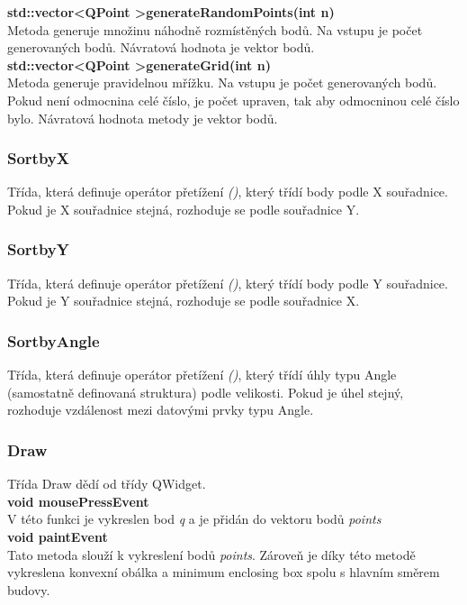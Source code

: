 \documentclass[a4paper,11pt,twoside]{article}
\begin{document}
\noindent\textbf{std::vector\textless QPoint \textgreater generateRandomPoints(int n)}\\
Metoda generuje množinu náhodně rozmístěných bodů. Na vstupu je počet generovaných bodů. Návratová hodnota je vektor bodů.\\

\noindent\textbf{std::vector\textless QPoint \textgreater generateGrid(int n)}\\
Metoda generuje pravidelnou mřížku. Na vstupu je počet generovaných bodů.  Pokud není odmocnina celé číslo, je počet upraven, tak aby odmocninou celé číslo bylo. Návratová hodnota metody je vektor bodů.

\subsubsection{SortbyX}
Třída, která definuje operátor přetížení \textit{()}, který třídí body podle X souřadnice. Pokud je X souřadnice stejná, rozhoduje se podle souřadnice Y.

\subsubsection{SortbyY}
Třída, která definuje operátor přetížení \textit{()}, který třídí body podle Y souřadnice. Pokud je Y souřadnice stejná, rozhoduje se podle souřadnice X.

\subsubsection{SortbyAngle}
Třída, která definuje operátor přetížení \textit{()}, který třídí úhly typu Angle (samostatně definovaná struktura) podle velikosti. Pokud je úhel stejný, rozhoduje vzdálenost mezi datovými prvky typu Angle.

\newpage
\vspace*{-1cm}
\subsubsection{Draw}
Třída Draw dědí od třídy QWidget. \\

\noindent\textbf{void mousePressEvent}\\
V této funkci je vykreslen bod \textit{q} a je přidán do vektoru bodů \textit{points}\\

\noindent\textbf{void paintEvent}\\
Tato metoda slouží k vykreslení bodů \textit{points}. Zároveň je díky této metodě vykreslena konvexní obálka a minimum enclosing box spolu s hlavním směrem budovy.\\
\end{document}
